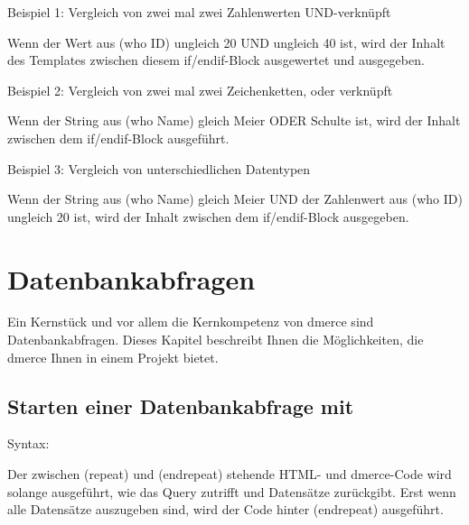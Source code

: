 \bigskip

Beispiel 1: Vergleich von zwei mal zwei Zahlenwerten UND-verkn\"upft


Wenn der Wert aus (who ID) ungleich 20 UND ungleich 40 ist, wird der
Inhalt des Templates zwischen diesem if/endif-Block ausgewertet und
ausgegeben.

\medskip

Beispiel 2: Vergleich von zwei mal zwei Zeichenketten, oder verkn\"upft


Wenn der String aus (who Name) gleich Meier ODER Schulte ist, wird der
Inhalt zwischen dem if/endif-Block ausgef\"uhrt.

\medskip

Beispiel 3: Vergleich von unterschiedlichen Datentypen


Wenn der String aus (who Name) gleich Meier UND der Zahlenwert aus
(who ID) ungleich 20 ist, wird der Inhalt zwischen dem if/endif-Block
ausgegeben.

\chapter{Datenbankabfragen}

Ein Kernst\"uck und vor allem die Kernkompetenz von dmerce sind
Datenbankabfragen. Dieses Kapitel beschreibt Ihnen die
M\"oglichkeiten, die dmerce Ihnen in einem Projekt bietet.

\newpage
\section{Starten einer Datenbankabfrage mit }
\label{repeat}

Syntax: 

\medskip

Der zwischen (repeat) und (endrepeat) stehende HTML- und dmerce-Code
wird solange ausgef\"uhrt, wie das Query zutrifft und Datens\"atze
zur\"uckgibt. Erst wenn alle Datens\"atze auszugeben sind, wird der
Code hinter (endrepeat) ausgef\"uhrt.

